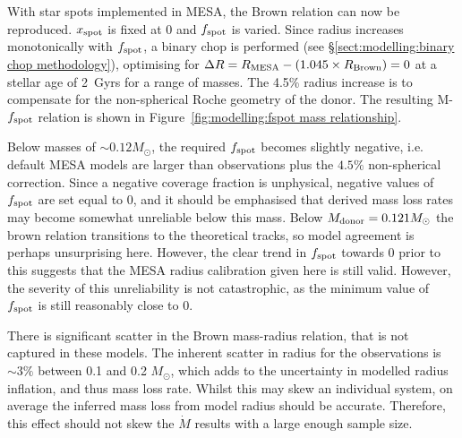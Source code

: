 With star spots implemented in MESA, the Brown relation can now be reproduced.
$x_{\rm spot}$ is fixed at 0 and $f_{\rm spot}$ is varied.
Since radius increases monotonically with $f_{\rm spot}$, a binary chop is performed (see \S\ref{sect:modelling:binary chop methodology}), optimising for $\Delta R=R_{\rm MESA}-(1.045\times R_{\rm Brown})=0$ at a stellar age of 2~Gyrs for a range of masses. The 4.5\% radius increase is to compensate for the non-spherical Roche geometry of the donor.
The resulting M-$f_{\rm spot}$ relation is shown in Figure~\ref{fig:modelling:fspot mass relationship}.

Below masses of $\sim 0.12 M_\odot$, the required $f_{\rm spot}$ becomes slightly negative, i.e. default MESA models are larger than observations plus the $4.5\%$ non-spherical correction.
Since a negative coverage fraction is unphysical, negative values of $f_{\rm spot}$ are set equal to 0, and it should be emphasised that derived mass loss rates may become somewhat unreliable below this mass.
Below $M_{\rm donor} = 0.121 M_\odot$ the brown relation transitions to the \citet{baraffe2015} theoretical tracks, so model agreement is perhaps unsurprising here. However, the clear trend in $f_{\rm spot}$ towards 0 prior to this suggests that the MESA radius calibration given here is still valid.
However, the severity of this unreliability is not catastrophic, as the minimum value of $f_{\rm spot}$ is still reasonably close to 0.

There is significant scatter in the Brown mass-radius relation, that is not captured in these models. The inherent scatter in radius for the observations is $\sim 3\%$ between 0.1 and 0.2 $M_\odot$, which adds to the uncertainty in modelled radius inflation, and thus mass loss rate.
Whilst this may skew an individual system, on average the inferred mass loss from model radius should be accurate. Therefore, this effect should not skew the $\dot M$ results with a large enough sample size.


